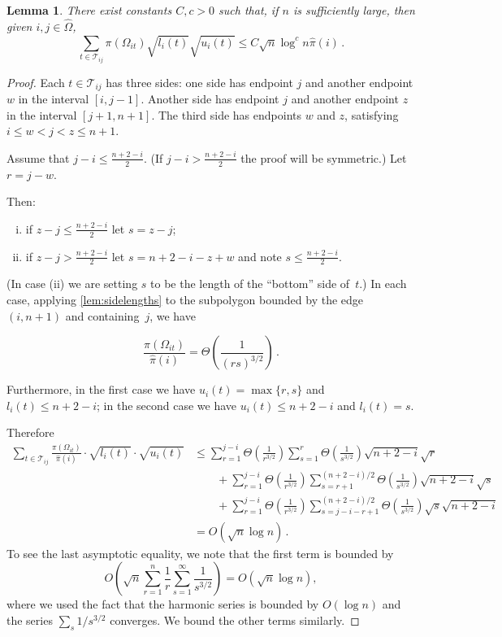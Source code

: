 \documentclass[a4paper, 12p]{article}
\numberwithin{equation}{section}
\newcommand{\Omorproj}{\hat{\Omega}}
\newcommand{\piorproj}{\hat{\pi}}
\newtheorem{lemma}[theorem]{Lemma}
\begin{document}
\begin{lemma}\label{lem:boundlu}
    There exist constants $C,c > 0$ such that, if $n$ is sufficiently large, then given $i,j\in \Omorproj$, 
    \begin{equation*}
        \sum_{t \in \mathcal{T}_{ij}} \pi(\Omega_{it})\sqrt{l_i(t)}\sqrt{u_i(t)} \leq C \sqrt{n}\log^c n \piorproj(i)\,.
    \end{equation*}
\end{lemma}
\begin{proof}
    Each $t \in \mathcal{T}_{ij}$ has three sides: one side has endpoint $j$ and another endpoint $w$ in the interval $[i, j-1]$. Another side has endpoint $j$ and another endpoint $z$ in the interval $[j+1, n+1]$. The third side has endpoints $w$ and $z$, satisfying $i \leq w < j < z \leq n + 1$.

    Assume that $j - i \leq \frac{n+2-i}{2}$. (If $j - i > \frac{n+2-i}{2}$ the proof will be symmetric.) Let $r = j - w$.

    Then:
    \begin{enumerate}[(i)]
        \item if $z - j \leq \frac{n+2-i}{2}$ let $s = z - j$;
        \item if $z - j > \frac{n+2-i}{2}$ let $s = n+2-i - z + w$ and note $s \leq \frac{n+2-i}{2}$.
    \end{enumerate}
    (In case (ii) we are setting $s$ to be the length of the ``bottom'' side of~$t$.) 
    In each case, applying \cref{lem:sidelengths} to the subpolygon bounded by the edge $(i, n+1)$ and containing~$j$, we have 
    
    \[
        \frac{\pi(\Omega_{it})}{\piorproj(i)} = \Theta\left(\frac{1}{(rs)^{3/2}}\right)\,.
    \]

    Furthermore, in the first case we have $u_i(t) = \max\{r,s\}$ and $l_i(t) \leq n + 2 - i$; in the second case we have $u_i(t) \leq n + 2 - i$ and $l_i(t) = s$.

    Therefore
    \begin{align}
        \sum_{t \in \mathcal{T}_{ij}}\frac{\pi(\Omega_{it})}{\piorproj(i)} \cdot \sqrt{l_i(t)}\cdot \sqrt{u_i(t)} 
        & \leq  \sum_{r=1}^{j-i}\Theta\left(\frac{1}{r^{3/2}}\right)\sum_{s=1}^{r}\Theta\left(\frac{1}{s^{3/2}}\right)\sqrt{n+2-i}\sqrt{r} \nonumber \\
        &\qquad+ \sum_{r=1}^{j-i}\Theta\left(\frac{1}{r^{3/2}}\right)\sum_{s=r+1}^{(n+2-i)/2}\Theta\left(\frac{1}{s^{3/2}}\right)\sqrt{n+2-i}\sqrt{s} \nonumber  \\
        &\qquad+  \sum_{r=1}^{j-i} \Theta\left(\frac{1}{r^{3/2}}\right)\sum_{s=j-i-r+1}^{(n+2-i)/2}\Theta\left(\frac{1}{s^{3/2}}\right)\sqrt{s}\sqrt{n+2-i} \nonumber \\
        &= O\left(\sqrt{n}\log n\right)\,. \nonumber
    \end{align}
To see the last asymptotic equality, we note that the first term is bounded by
$$O\left(\sqrt{n}\sum_{r=1}^n\frac{1}{r}\sum_{s=1}^\infty\frac{1}{s^{3/2}}\right)=O(\sqrt{n}\log n),$$
where we used the fact that the harmonic series is bounded by $O(\log n)$ and the series $\sum_s 1/s^{3/2}$ converges. We bound the other terms similarly.

\end{proof}
\end{document}
